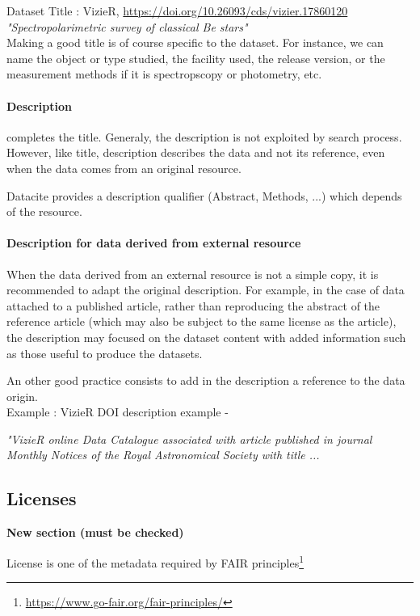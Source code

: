 \documentclass[11pt,a4paper]{ivoa}
\begin{document}
Dataset Title : VizieR, \url{https://doi.org/10.26093/cds/vizier.17860120} \\
\textit{"Spectropolarimetric survey of classical Be stars"}\\


Making a good title is of course specific to the dataset. For instance, we can name the object or type studied, the facility used, the release version, or the measurement methods if it is spectropscopy or photometry, etc.


\paragraph{Description} completes the title. Generaly, the description is not exploited by search process. However, like title, description describes the data and not its reference, even when the data comes from an original resource.


Datacite provides a description qualifier (Abstract, Methods, ...) which depends of the resource.

\paragraph{Description for data derived from external resource}
When the data derived from an external resource is not a simple copy, it is recommended to adapt the original description. For example, in the case of data attached to a published article, rather than reproducing the abstract of the reference article (which may also be subject to the same license as the article), the description may focused on the dataset content with added information such as those useful to produce the datasets.


An other good practice consists to add in the description a reference to the data origin.\\


Example : VizieR DOI description example -

\textit{"VizieR online Data Catalogue associated with article published in journal Monthly Notices of the Royal Astronomical Society with title ... }

\subsection{Licenses}
\label{sec:licenses}
\textbf{\color{red}New section (must be checked)}

License is one of the metadata required by FAIR principles\footnote{\url{https://www.go-fair.org/fair-principles/}}
\end{document}
